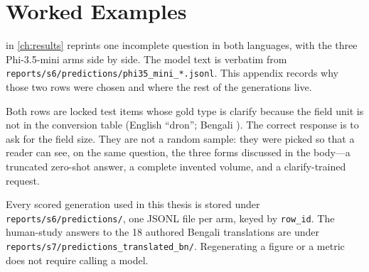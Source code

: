 \chapter{Worked Examples}
\label{app:A}
\label{app:examples}

 in \cref{ch:results} reprints one incomplete question in both languages, with the three Phi-3.5-mini arms side by side. The model text is verbatim from \texttt{reports/s6/predictions/phi35\_mini\_*.jsonl}. This appendix records why those two rows were chosen and where the rest of the generations live.

Both rows are locked test items whose gold type is clarify because the field unit is not in the conversion table (English ``dron''; Bengali ). The correct response is to ask for the field size. They are not a random sample: they were picked so that a reader can see, on the same question, the three forms discussed in the body---a truncated zero-shot answer, a complete invented volume, and a clarify-trained request.

Every scored generation used in this thesis is stored under \texttt{reports/s6/predictions/}, one JSONL file per arm, keyed by \texttt{row\_id}. The human-study answers to the 18 authored Bengali translations are under \texttt{reports/s7/predictions\_translated\_bn/}. Regenerating a figure or a metric does not require calling a model.
